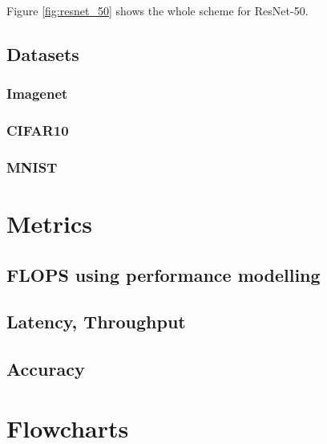 \documentclass[titlepage]{report}
\begin{document}
Figure \ref{fig:resnet_50} shows the whole scheme for ResNet-50.


\section{Datasets}
\lipsum[3]

\subsection{Imagenet}
\lipsum[3]

\subsection{CIFAR10}
\lipsum[3]

\subsection{MNIST}
\lipsum[3]




\chapter{Metrics}

\section{FLOPS using performance modelling}
\lipsum[3]

\section{Latency, Throughput}
\lipsum[3]

\section{Accuracy}
\lipsum[3]




\chapter{Flowcharts}
\end{document}
